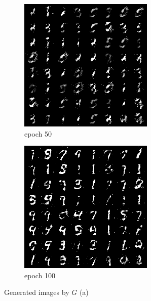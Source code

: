 \documentclass[a4paper]{article}
\theoremstyle{definition}
\newenvironment{soln}{
	\leavevmode\color{blue}\ignorespaces
}{}
\begin{document}
\begin{enumerate} [label=(\alph*)]
\begin{soln}
\begin{figure}[H]
\begin{subfigure}[b]{0.3\textwidth}
				      \centering
				      \includegraphics[width=\textwidth]{img/q1_1/gen_img50.png}
				      \caption{epoch 50}
			      \end{subfigure}
			      \hfill
			      \begin{subfigure}[b]{0.3\textwidth}
				      \centering
				      \includegraphics[width=\textwidth]{img/q1_1/gen_img100.png}
				      \caption{epoch 100}
			      \end{subfigure}
			      \caption*{Generated images by $G$ (a)}
		      \end{figure}
	      \end{soln}




\end{enumerate}
\end{document}
